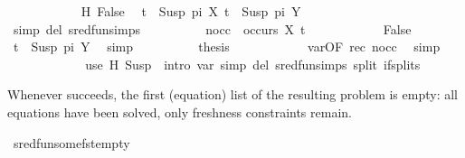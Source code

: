 \begin{isabellebody}
\ \ \ \ \ \ \ \ \ \ \isamarkupfalse%
\ H\ False\ \isamarkupfalse%
\ {\isacartoucheopen}t{}\ {\isacharequal}{\kern0pt}\ Susp\ pi\ X{\isacartoucheclose}\ {\isacartoucheopen}t{}\ {\isacharequal}{\kern0pt}\ Susp\ pi{}\ Y{\isacartoucheclose}\isanewline
\ \ \ \ \ \ \ \ \ \ \isamarkupfalse%
\ {\isacharparenleft}{\kern0pt}simp\ del{\isacharcolon}{\kern0pt}\ sred{\isacharunderscore}{\kern0pt}fun{\isachardot}{\kern0pt}simps{\isacharparenright}{\kern0pt}\isanewline
\ \ \ \ \ \ \ \ \isamarkupfalse%
\ nocc{\isacharcolon}{\kern0pt}\ {\isachardoublequoteopen}{\isasymnot}\ occurs\ X\ t{}{\isachardoublequoteclose}\isanewline
\ \ \ \ \ \ \ \ \ \ \isamarkupfalse%
\ False\ \isamarkupfalse%
\ {\isacartoucheopen}t{}\ {\isacharequal}{\kern0pt}\ Susp\ pi{}\ Y{\isacartoucheclose}\ \isamarkupfalse%
\ simp\isanewline
\ \ \ \ \ \ \ \ \isamarkupfalse%
\ {\isacharquery}{\kern0pt}thesis\isanewline
\ \ \ \ \ \ \ \ \ \ \isamarkupfalse%
\ var{\isacharunderscore}{\kern0pt}{}{\isacharbrackleft}{\kern0pt}OF\ rec\ nocc{\isacharbrackright}{\kern0pt}\ \isamarkupfalse%
\ simp\isanewline
\ \ \ \ \ \ \isamarkupfalse%
\isanewline
\ \ \ \ \isamarkupfalse%
\ {\isacharparenleft}{\kern0pt}use\ H\ Susp\ \ {\isacartoucheopen}{\isacharparenleft}{\kern0pt}intro\ var{\isacharunderscore}{\kern0pt}{}{\isacharsemicolon}{\kern0pt}\ simp\ del{\isacharcolon}{\kern0pt}\ sred{\isacharunderscore}{\kern0pt}fun{\isachardot}{\kern0pt}simps\ split{\isacharcolon}{\kern0pt}\ if{\isacharunderscore}{\kern0pt}splits{\isacharparenright}{\kern0pt}{\isacartoucheclose}{\isacharparenright}{\kern0pt}{\isacharplus}{\kern0pt}\isanewline
\ \ \isamarkupfalse%
\isanewline
{}\isamarkupfalse%
%
\endisatagproof
{\isafoldproof}%
%
\isadelimproof
%
\endisadelimproof
%
\begin{isamarkuptext}%
Whenever  succeeds, the first (equation) list of the resulting problem is empty:
all equations have been solved, only freshness constraints remain.%
\end{isamarkuptext}\isamarkuptrue%
\isamarkupfalse%
\ sred{\isacharunderscore}{\kern0pt}fun{\isacharunderscore}{\kern0pt}some{\isacharunderscore}{\kern0pt}fst{\isacharunderscore}{\kern0pt}empty{\isacharcolon}{\kern0pt}\isanewline

\end{isabellebody}
